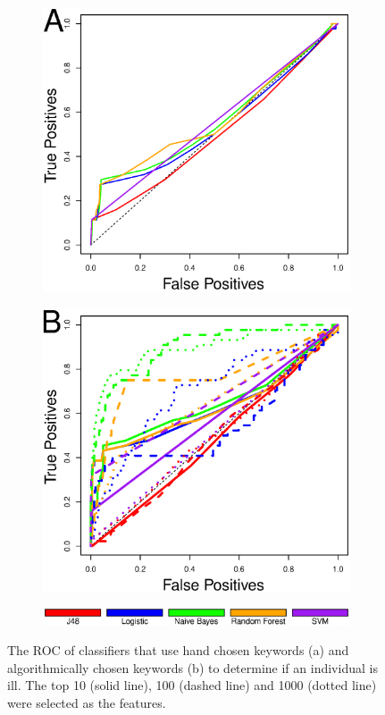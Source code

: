 \documentclass{acm_proc_article-sp}
\begin{document}
\begin{figure} [h]
\centering
\begin{subfigure}[b]{.2\textwidth}
\includegraphics[width=\textwidth]{figs/key_exp_roc.eps}
\end{subfigure}
\begin{subfigure}[b]{.2\textwidth}
\includegraphics[width=\textwidth]{figs/key_dm_roc.eps}
\end{subfigure}
\begin{subfigure}[b]{.45\textwidth}
\includegraphics[width=\textwidth]{figs/keyword_legend.eps}
\end{subfigure}
\caption{The ROC of classifiers that use hand chosen keywords (a) and algorithmically chosen keywords (b) to determine if an individual is ill. The top 10 (solid line), 100 (dashed line) and 1000 (dotted line) were selected as the features.}
\label{fig:roc_keyword}
\end{figure}
\end{document}
